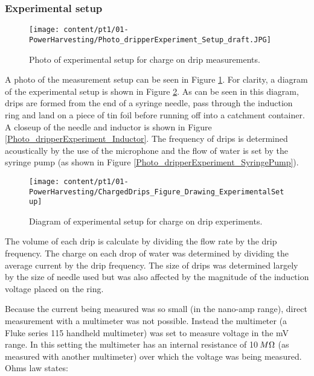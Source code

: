 \subsubsection{Experimental setup}

\begin{figure}[H]
\begin{centering}
\texttt{[image: content/pt1/01-PowerHarvesting/Photo\_dripperExperiment\_Setup\_draft.JPG]}
\par\end{centering}

\centering{}\protect\caption{\label{Photo_dripperExperiment_Setup}Photo of experimental setup
for charge on drip measurements.}
\end{figure}


A photo of the measurement setup can be seen in Figure \ref{Photo_dripperExperiment_Setup}.
For clarity, a diagram of the experimental setup is shown in Figure
\ref{ChargedDrips_Figure_Drawing_ExperimentalSetup}. As can be seen
in this diagram, drips are formed from the end of a syringe needle,
pass through the induction ring and land on a piece of tin foil before
running off into a catchment container. A closeup of the needle and
inductor is shown in Figure \ref{Photo_dripperExperiment_Inductor}.
The frequency of drips is determined acoustically by the use of the
microphone and the flow of water is set by the syringe pump (as shown
in Figure \ref{Photo_dripperExperiment_SyringePump}).

\begin{figure}[h]
\begin{centering}
\texttt{[image: content/pt1/01-PowerHarvesting/ChargedDrips\_Figure\_Drawing\_ExperimentalSetup]}
\par\end{centering}

\protect\caption{\label{ChargedDrips_Figure_Drawing_ExperimentalSetup}Diagram of experimental
setup for charge on drip experiments.}
\end{figure}


The volume of each drip is calculate by dividing the flow rate by
the drip frequency. The charge on each drop of water was determined
by dividing the average current by the drip frequency. The size of
drips was determined largely by the size of needle used but was also
affected by the magnitude of the induction voltage placed on the ring.

Because the current being measured was so small (in the nano-amp range),
direct measurement with a multimeter was not possible. Instead the
multimeter (a Fluke series 115 handheld multimeter) was set to measure
voltage in the mV range. In this setting the multimeter has an internal
resistance of 10$\thinspace M\Omega$ (as measured with another multimeter)
over which the voltage was being measured. Ohms law states:

